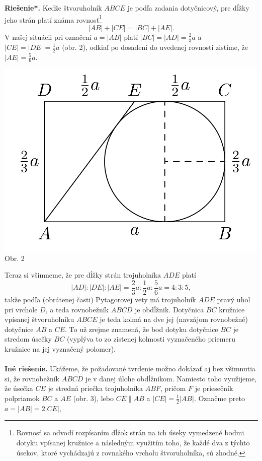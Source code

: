 \documentclass[11pt,a4paper,oneside,final]{book}
\newcommand{\rieh}{\textbf{Riešenie*.} }
\begin{document}
\rieh Keďže štvoruholník $ABCE$ je podľa zadania dotyčnicový, pre dĺžky jeho strán platí známa rovnosť\footnote{Rovnosť sa odvodí rozpísaním dĺžok strán na ich úseky vymedzené bodmi dotyku vpísanej kružnice a následným využitím toho, že každé dva z týchto úsekov, ktoré vychádzajú z rovnakého vrcholu
štvoruholníka, sú zhodné.}
$$|AB| + |CE| = |BC| + |AE|.$$
V našej situácii pri označení $a = |AB|$ platí $|BC| = |AD| = \frac{2}{3}a$ a $|CE| = |DE| =\frac{1}{2}a$
(obr. 2), odkiaľ po dosadení do uvedenej rovnosti zistíme, že $|AE| = \frac{5}{6}a$.
\begin{center}
\includegraphics[scale=0.3]{61K31}\\

Obr. 2
\end{center}
Teraz si všimneme, že pre dĺžky strán trojuholníka $ADE$ platí
$$|AD| : |DE| : |AE| = \frac{2}{3}a : \frac{1}{2}a : \frac{5}{6}a = 4 : 3 : 5,$$
takže podľa (obrátenej časti) Pytagorovej vety má trojuholník $ADE$ pravý uhol pri vrchole $D$, a teda rovnobežník $ABCD$ je obdĺžnik. Dotyčnica $BC$ kružnice vpísanej štvoruholníku $ABCE$ je teda kolmá na dve jej (navzájom rovnobežné) dotyčnice $AB$ a $CE$. To už zrejme znamená, že bod dotyku dotyčnice $BC$ je stredom úsečky $BC$ (vyplýva to zo zistenej kolmosti vyznačeného priemeru kružnice na jej vyznačený
polomer).\\
\\
\textbf{Iné riešenie.} Ukážeme, že požadované tvrdenie možno dokázať aj bez všimnutia si, že rovnobežník $ABCD$ je v danej úlohe obdĺžnikom. Namiesto toho využijeme, že úsečka $CE$ je stredná priečka trojuholníka $ABF$, pričom $F$ je priesečník polpriamok $BC$ a $AE$ (obr. 3), lebo $CE \parallel AB$ a $|CE| =\frac{1}{2}|AB|$. Označme preto $a = |AB| = 2|CE|$,
\end{document}
